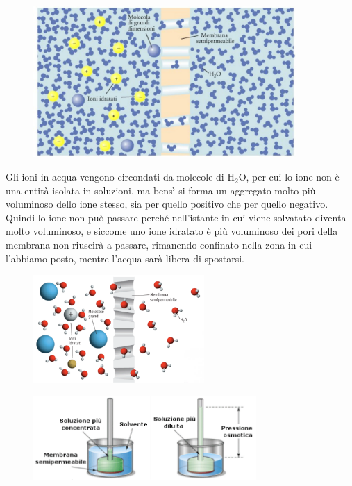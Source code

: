 \begin{figure}[htp]
    \centering
    \includegraphics[width=10cm]{immagini/osmosi.png}
\end{figure}
\newpage
Gli ioni in acqua vengono circondati da molecole di H$_2$O, per cui lo ione non è una entità isolata in soluzioni, ma bensì si forma un aggregato molto più voluminoso dello ione stesso, sia per quello positivo che per quello negativo. Quindi lo ione non può passare perché nell'istante in cui viene solvatato diventa molto voluminoso, e siccome uno ione idratato è più voluminoso dei pori della membrana non riuscirà a passare, rimanendo confinato nella zona in cui l'abbiamo posto, mentre l'acqua sarà libera di spostarsi.

\hspace{0.5cm}\begin{minipage}{0.5\textwidth}
    \begin{figure}[H]
        \includegraphics[width=6.5cm]{immagini/membrana.png}
    \end{figure}
\end{minipage}
\hspace{-1.3cm}\begin{minipage}{0.5\textwidth}
    \begin{figure}[H]
        \includegraphics[width=8.5cm]{immagini/pressione_osmotica.png}
    \end{figure}
\end{minipage}

